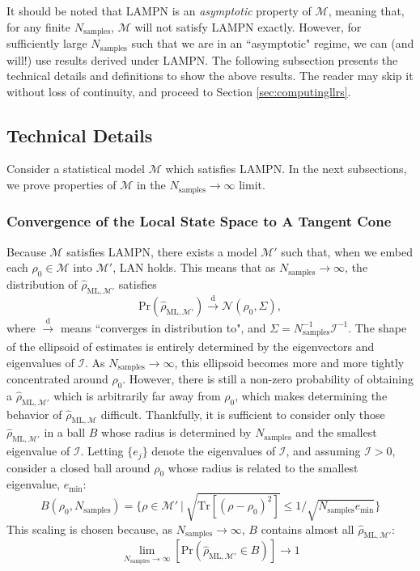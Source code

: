 \documentclass[aps,pra, twocolumn]{revtex4-1}
\newcommand{\M}{\mathcal{M}}
\newcommand{\rhohat}{\hat{\rho}}
\newcommand{\rhoML}[1]{\rhohat_{\scriptscriptstyle{\mathrm{ML},#1}}}
\begin{document}
It should be noted that LAMPN is an \emph{asymptotic} property of $\M$, meaning that, for any finite $N_{\mathrm{samples}}$, $\M$ will not satisfy LAMPN exactly. However, for sufficiently large $N_{\mathrm{samples}}$ such that we are in an ``asymptotic" regime, we can (and will!) use results derived under LAMPN. The following subsection presents the technical details and definitions to show the above results. The reader may skip it without loss of continuity, and proceed to Section \ref{sec:computingllrs}.

\subsection{Technical Details}

Consider a statistical model $\M$ which satisfies LAMPN. In the next subsections, we prove properties of $\M$ in the $N_{\mathrm{samples}} \rightarrow \infty$ limit.

\subsubsection{Convergence of the Local State Space to A Tangent Cone}


Because $\M$ satisfies LAMPN, there exists a model $\M'$ such that, when we embed each $\rho_{0} \in \M$ into $\M'$, LAN holds. This means that as $N_{\mathrm{samples}} \rightarrow \infty$, the distribution of $\rhoML{\M'}$ satisfies
\[\mathrm{Pr}(\rhoML{\M'})\xrightarrow[]{\text{d}} \mathcal{N}(\rho_{0}, \Sigma),\]
where $\xrightarrow[]{\text{d}}$ means ``converges in distribution to", and $\Sigma = N^{-1}_{\mathrm{samples}}\mathcal{I}^{-1}$.
The shape of the ellipsoid of estimates is entirely determined by the eigenvectors and eigenvalues of $\mathcal{I}$. As $N_{\mathrm{samples}} \rightarrow \infty$, this ellipsoid becomes more and more tightly concentrated around $\rho_{0}$. However, there is still a non-zero probability of obtaining a $\rhoML{\M'}$ which is arbitrarily far away from $\rho_{0}$, which makes determining the behavior of $\rhoML{\M}$ difficult. Thankfully, it is sufficient to consider only those $\rhoML{\M'}$ in a ball $B$ whose radius is determined by $N_{\mathrm{samples}}$ and the smallest eigenvalue of $\mathcal{I}$. Letting $\{e_{j}\}$ denote the eigenvalues of $\mathcal{I}$, and assuming $\mathcal{I} > 0$, consider a closed ball around $\rho_{0}$ whose radius is related to the smallest eigenvalue, $e_{\min}$:
\[B(\rho_{0}, N_{\mathrm{samples}}) =\{\rho \in \M'~|~\sqrt{\mathrm{Tr}[(\rho - \rho_{0})^{2}]} \leq 1/\sqrt{N_{\mathrm{samples}}e_{\min}}\}\]
This scaling is chosen because, as $N_{\mathrm{samples}} \rightarrow \infty$, $B$ contains almost all $\rhoML{\M'}$:
 \[\lim_{N_{\mathrm{samples}} \rightarrow \infty}\left[\mathrm{Pr}\left(\rhoML{\M'} \in B\right)\right] \rightarrow 1\]
\end{document}
